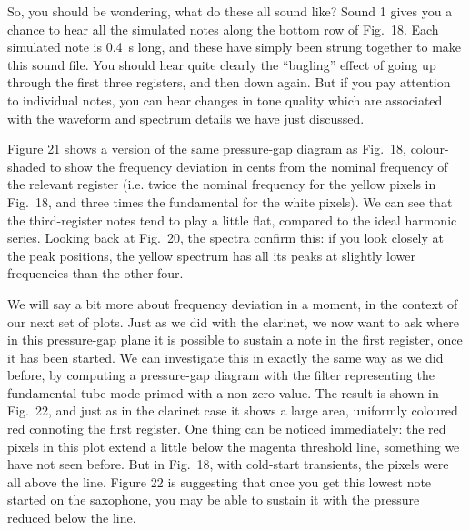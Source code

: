 
  So, you should be wondering, what do these all sound like? Sound 1 gives you 
  a chance to hear all the simulated notes along the bottom row of Fig.\ 18. 
  Each simulated note is 0.4~s long, and these have simply been strung together 
  to make this sound file. You should hear quite clearly the “bugling” effect 
  of going up through the first three registers, and then down again. But if 
  you pay attention to individual notes, you can hear changes in tone quality 
  which are associated with the waveform and spectrum details we have just 
  discussed. 

  Figure 21 shows a version of the same pressure-gap diagram as Fig.\ 18, 
  colour-shaded to show the frequency deviation in cents from the nominal 
  frequency of the relevant register (i.e. twice the nominal frequency for the 
  yellow pixels in Fig.\ 18, and three times the fundamental for the white 
  pixels). We can see that the third-register notes tend to play a little flat, 
  compared to the ideal harmonic series. Looking back at Fig.\ 20, the spectra 
  confirm this: if you look closely at the peak positions, the yellow spectrum 
  has all its peaks at slightly lower frequencies than the other four. 


  We will say a bit more about frequency deviation in a moment, in the context 
  of our next set of plots. Just as we did with the clarinet, we now want to 
  ask where in this pressure-gap plane it is possible to sustain a note in the 
  first register, once it has been started. We can investigate this in exactly 
  the same way as we did before, by computing a pressure-gap diagram with the 
  filter representing the fundamental tube mode primed with a non-zero value. 
  The result is shown in Fig.\ 22, and just as in the clarinet case it shows a 
  large area, uniformly coloured red connoting the first register. One thing 
  can be noticed immediately: the red pixels in this plot extend a little below 
  the magenta threshold line, something we have not seen before. But in Fig.\ 
  18, with cold-start transients, the pixels were all above the line. Figure 22 
  is suggesting that once you get this lowest note started on the saxophone, 
  you may be able to sustain it with the pressure reduced below the line. 

